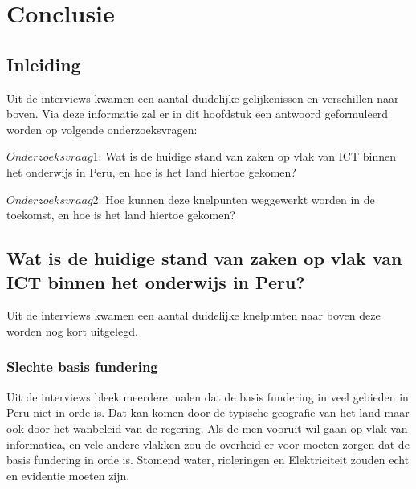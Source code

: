 

\chapter{Conclusie}
\label{ch:conclusie}


\section{Inleiding}
Uit de interviews kwamen een aantal duidelijke gelijkenissen en verschillen naar boven. Via deze informatie zal er in dit hoofdstuk een antwoord geformuleerd worden op volgende onderzoeksvragen:

$Onderzoeksvraag 1$: Wat is de huidige stand van zaken op vlak van ICT binnen het onderwijs in Peru, en hoe is het land hiertoe gekomen?

$Onderzoeksvraag 2$: Hoe kunnen deze knelpunten weggewerkt worden in de toekomst, en hoe is het land hiertoe gekomen?

\section{Wat is de huidige stand van zaken op vlak van ICT binnen het onderwijs in Peru?}
Uit de interviews kwamen een aantal duidelijke knelpunten naar boven deze worden nog kort uitgelegd.



\subsection{Slechte basis fundering}
Uit de interviews bleek meerdere malen dat de basis fundering in veel gebieden in Peru niet in orde is. Dat kan komen door de typische geografie van het land maar ook door het wanbeleid van de regering. Als de men vooruit wil gaan op vlak van informatica, en vele andere vlakken zou de overheid  er voor moeten zorgen dat de basis fundering in orde is. Stomend water, rioleringen en Elektriciteit zouden echt en evidentie moeten zijn.

